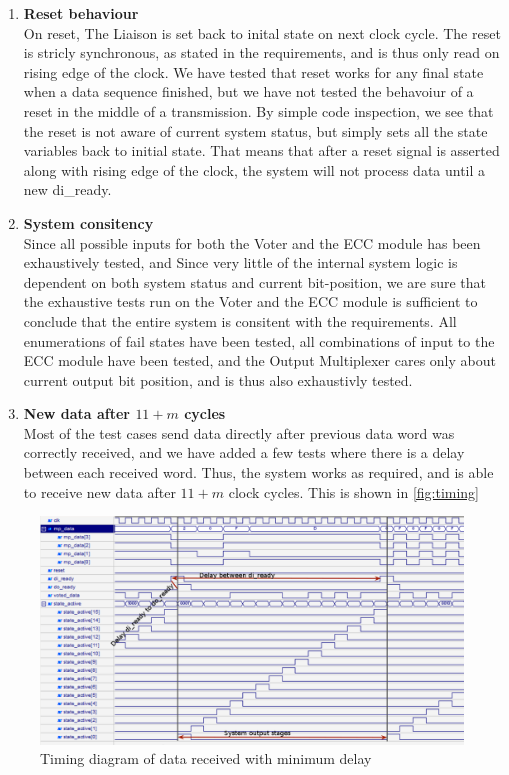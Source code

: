 \begin{enumerate}
\item{\textbf{Reset behaviour}} \hfill\\
    On reset, The Liaison is set back to inital state on next clock cycle. The reset is stricly synchronous,
    as stated in the requirements\cite{task}, and is thus only read on rising edge of the clock. We have
    tested that reset works for any final state when a data sequence finished, but we have not tested the
    behavoiur of a reset in the middle of a transmission. By simple code inspection, we see that the
    reset is not aware of current system status, but simply sets all the state variables back to initial
    state. That means that after a reset signal is asserted along with rising edge of the clock, the system
    will not process data until a new {\ttfamily di\_ready}.

\item{\textbf{System consitency}} \hfill\\
    Since all possible inputs for both the Voter and the ECC module has been exhaustively tested, and 
    Since very little of the internal system logic is dependent on both system status and current bit-position,
    we are sure that the exhaustive tests run on the Voter and the ECC module is sufficient to conclude that 
    the entire system is consitent with the requirements. All enumerations of fail states have been tested, all combinations
    of input to the ECC module have been tested, and the Output Multiplexer cares only about current output bit position,
    and is thus also exhaustivly tested.

\item{\textbf{New data after $11+m$ cycles}} \hfill\\
    Most of the test cases send data directly after previous data word was correctly received, and we have
    added a few tests where there is a delay between each received word. Thus, the system works as required,
    and is able to receive new data after $11+m$ clock cycles. This is shown in \autoref{fig:timing}

\end{enumerate}

\begin{figure}
    \includegraphics[width=\textwidth]{tests/timing}
    \caption{Timing diagram of data received with minimum delay}
    \label{fig:timing}
\end{figure}
